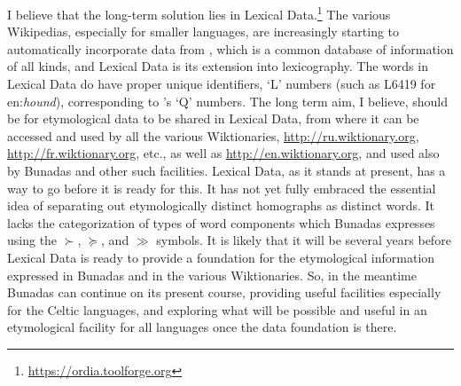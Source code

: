 \documentclass[output=paper,colorlinks,citecolor=brown]{langscibook}
\begin{document}
I believe that the long-term solution lies in  Lexical Data.\footnote{\url{https://ordia.toolforge.org}} The various Wikipedias, especially for smaller languages, are increasingly starting to automatically incorporate data from , which is a common database of information of all kinds, and  Lexical Data is its extension into lexicography. The words in  Lexical Data do have proper unique identifiers, ‘L’ numbers (such as L6419 for en:\textit{hound}), corresponding to ’s ‘Q’ numbers. The long term aim, I believe, should be for etymological data to be shared in  Lexical Data, from where it can be accessed and used by all the various Wiktionaries, \url{http://ru.wiktionary.org}, \url{http://fr.wiktionary.org}, etc., as well as \url{http://en.wiktionary.org}, and used also by Bunadas and other such facilities.  Lexical Data, as it stands at present, has a way to go before it is ready for this. It has not yet fully embraced the essential idea of separating out etymologically distinct homographs as distinct words. It lacks the categorization of types of word components which Bunadas expresses using the ${\succ}$, ${\succcurlyeq}$, and ${\gg}$ symbols. It is likely that it will be several years before  Lexical Data is ready to provide a foundation for the etymological information expressed in Bunadas and in the various Wiktionaries. So, in the meantime Bunadas can continue on its present course, providing useful facilities especially for the Celtic languages, and exploring what will be possible and useful in an etymological facility for all languages once the data foundation is there.  

\printbibliography[heading=subbibliography,notkeyword=this]
\end{document}
